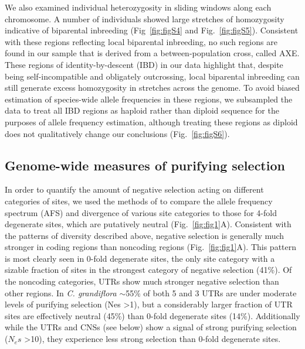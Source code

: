 We also examined individual heterozygosity in sliding windows along each chromosome. A number of individuals showed large stretches of homozygosity indicative of biparental inbreeding (Fig~\ref{fig:figS4} and Fig.~\ref{fig:figS5}). Consistent with these regions reflecting local biparental inbreeding, no such regions are found in our sample that is derived from a between-population cross, called AXE. These regions of identity-by-descent (IBD) in our data highlight that, despite being self-incompatible and obligately outcrossing, local biparental inbreeding can still generate excess homozygosity in stretches across the genome. To avoid biased estimation of species-wide allele frequencies in these regions, we subsampled the data to treat all IBD regions as haploid rather than diploid sequence for the purposes of allele frequency estimation, although treating these regions as diploid does not qualitatively change our conclusions (Fig.~\ref{fig:figS6}).

\subsection{Genome-wide measures of purifying selection}
In order to quantify the amount of negative selection acting on different categories of sites, we used the methods of \citet{keightley2010} to compare the allele frequency spectrum (AFS) and divergence of various site categories to those for 4-fold degenerate sites, which are putatively neutral (Fig.~\ref{fig:fig1}A). Consistent with the patterns of diversity described above, negative selection is generally much stronger in coding regions than noncoding regions (Fig.~\ref{fig:fig1}A). This pattern is most clearly seen in 0-fold degenerate sites, the only site category with a sizable fraction of sites in the strongest category of negative selection (41\%). Of the noncoding categories, UTRs show much stronger negative selection than other regions. In \textit{C. grandiflora} $\sim$55\% of both 5\textsc{} and 3\textsc{} UTRs are under moderate levels of purifying selection (Nes \textgreater 1), but a considerably larger fraction of UTR sites are effectively neutral (45\%) than 0-fold degenerate sites (14\%). Additionally while the UTRs and CNSs (see below) show a signal of strong purifying selection ($N_{e}s$ \textgreater 10), they experience less strong selection than 0-fold degenerate sites. 

